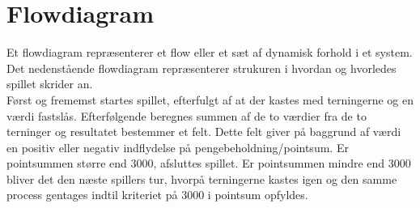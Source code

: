 \section{Flowdiagram}

\noindent Et flowdiagram repræsenterer et flow eller et sæt af dynamisk forhold i et system.
Det nedenstående flowdiagram repræsenterer strukuren i hvordan og hvorledes spillet skrider an.\\

\noindent Først og frememst startes spillet, efterfulgt af at der kastes med terningerne og en værdi fastslås.
Efterfølgende beregnes summen af de to værdier fra de to terninger og resultatet bestemmer et felt.
Dette felt giver på baggrund af værdi en positiv eller negativ indflydelse på pengebeholdning/pointsum.
Er pointsummen større end 3000, afsluttes spillet.
Er pointsummen mindre end 3000 bliver det den næste spillers tur, hvorpå terningerne kastes igen og den samme process gentages indtil kriteriet på 3000 i pointsum opfyldes.\\

